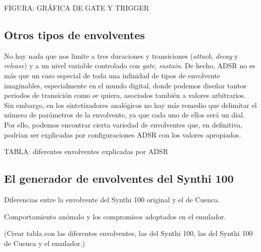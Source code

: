 FIGURA: GRÁFICA DE GATE Y TRIGGER

\subsection{Otros tipos de envolventes}

No hay nada que nos limite a tres duraciones y transiciones (\textit{attack}, \textit{decay} y \textit{release}) y a un nivel variable controlado con \textit{gate}, \textit{sustain}. De hecho, ADSR no es más que un caso especial de toda una infinidad de tipos de envolvente imaginables, especialmente en el mundo digital, donde podemos diseñar tantos periodos de transición como se quiera, asociados también a valores arbitrarios. Sin embargo, en los sintetizadores analógicos no hay más remedio que delimitar el número de parámetros de la envolvente, ya que cada uno de ellos será un dial. Por ello, podemos encontrar cierta variedad de envolventes que, en definitiva, podrían ser explicadas por configuraciones ADSR con los valores apropiados. 

TABLA: diferentes envolventes explicadas por ADSR

\subsection{El generador de envolventes del Synthi 100}

Diferencias entre la envolvente del Synthi 100 original y el de Cuenca.

Comportamiento anómalo y los compromisos adoptados en el emulador.

(Crear tabla con las diferentes envolventes, las del Synthi 100, las del Synthi 100 de Cuenca y el emulador.)